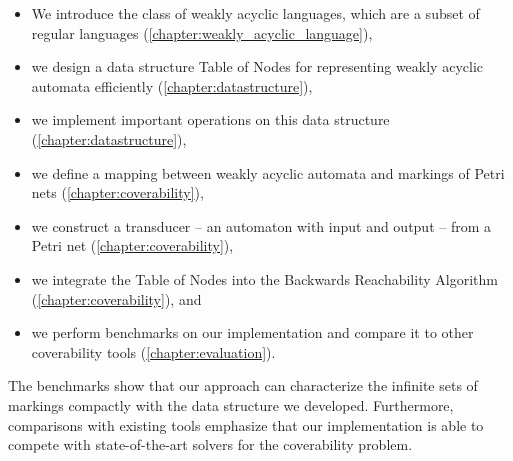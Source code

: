 \begin{itemize}[-]
\setlength\itemsep{0.2em}
\item We introduce the class of weakly acyclic languages, which are a subset of regular languages (\autoref{chapter:weakly_acyclic_language}),
\item we design a data structure Table of Nodes for representing weakly acyclic automata efficiently (\autoref{chapter:datastructure}),
\item we implement important operations on this data structure (\autoref{chapter:datastructure}),
\item we define a mapping between weakly acyclic automata and markings of Petri nets (\autoref{chapter:coverability}),
\item we construct a transducer -- an automaton with input and output -- from a Petri net (\autoref{chapter:coverability}),
\item we integrate the Table of Nodes into the Backwards Reachability Algorithm (\autoref{chapter:coverability}), and
\item we perform benchmarks on our implementation and compare it to other coverability tools (\autoref{chapter:evaluation}).
\end{itemize}

The benchmarks show that our approach can characterize the infinite sets of markings compactly with the data structure we developed. Furthermore, comparisons with existing tools emphasize that our implementation is able to compete with state-of-the-art solvers for the coverability problem.